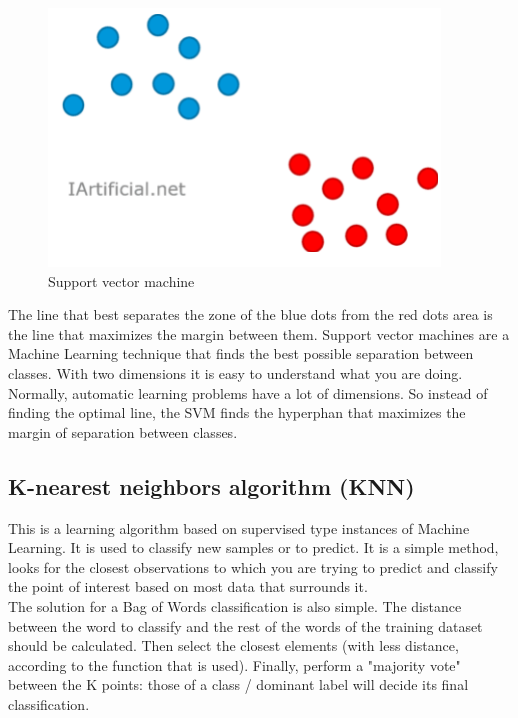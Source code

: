 \documentclass[sigconf,12pt,review=false,natbib=false]{acmart}
\begin{document}
\begin{figure}[h!]
    \centering
    \includegraphics[]{svm}
    \caption{Support vector machine}
    \label{fig:svm}
\end{figure}

The line that best separates the zone of the blue dots from the red dots area is the line that maximizes the margin
between them. Support vector machines are a Machine Learning technique that finds the best possible separation between
classes. With two dimensions it is easy to understand what you are doing. Normally, automatic learning problems have a
lot of dimensions. So instead of finding the optimal line, the SVM finds the hyperphan that maximizes the margin of
separation between classes.

\subsection{K-nearest neighbors algorithm (KNN)}

This is a learning algorithm based on supervised type instances of Machine Learning. It is used to classify new samples
or to predict. It is a simple method, looks for the closest observations to which you are trying to predict and classify
the point of interest based on most data that surrounds it. \\

The solution for a Bag of Words classification is also simple.
The distance between the word to classify and the rest of the words of the training dataset should be calculated. Then
select the closest elements (with less distance, according to the function that is used). Finally, perform a "majority
vote" between the K points: those of a class / dominant label will decide its final classification.
\end{document}
